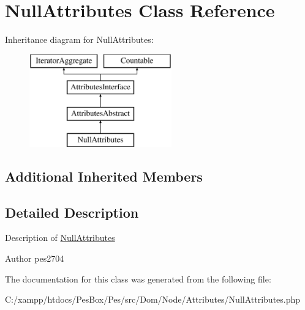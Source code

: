 \hypertarget{class_pes_1_1_dom_1_1_node_1_1_attributes_1_1_null_attributes}{}\section{Null\+Attributes Class Reference}
\label{class_pes_1_1_dom_1_1_node_1_1_attributes_1_1_null_attributes}
Inheritance diagram for Null\+Attributes\+:\begin{figure}[H]
\begin{center}
\leavevmode
\includegraphics[height=4.000000cm]{class_pes_1_1_dom_1_1_node_1_1_attributes_1_1_null_attributes}
\end{center}
\end{figure}
\subsection*{Additional Inherited Members}


\subsection{Detailed Description}
Description of \mbox{\hyperlink{class_pes_1_1_dom_1_1_node_1_1_attributes_1_1_null_attributes}{Null\+Attributes}}

\begin{DoxyAuthor}{Author}
pes2704 
\end{DoxyAuthor}


The documentation for this class was generated from the following file\+:\begin{DoxyCompactItemize}
\item 
C\+:/xampp/htdocs/\+Pes\+Box/\+Pes/src/\+Dom/\+Node/\+Attributes/Null\+Attributes.\+php\end{DoxyCompactItemize}
